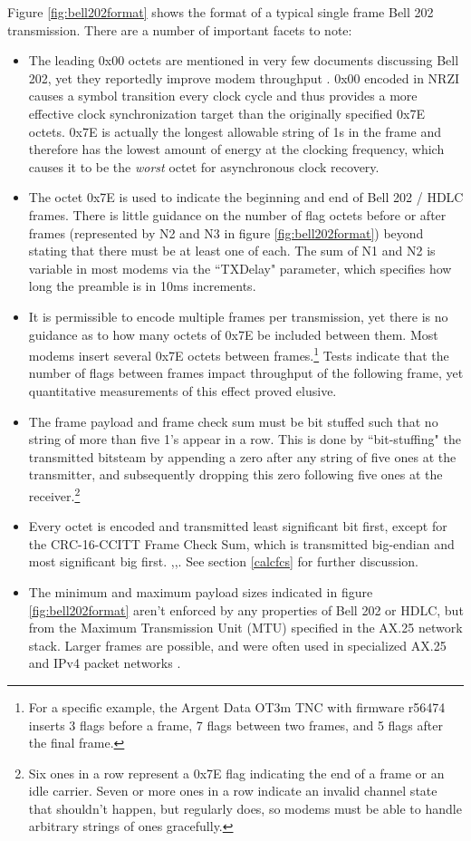 \documentclass[12pt,letterpaper]{article}
\begin{document}
Figure \ref{fig:bell202format} shows the format of a typical single frame
Bell 202 transmission. There are a number of important facets to note:
\begin{itemize}
	\item The leading 0x00 octets are mentioned in very few documents
		discussing Bell 202, yet they reportedly improve modem
		throughput \cite{millerinterview}\cite{aprsunveiled}. 
		0x00 encoded in NRZI causes a symbol transition
		every clock cycle and thus provides a more effective clock 
		synchronization target than the originally specified 0x7E octets. 
		0x7E is actually 
		the longest allowable string of 1s in the frame and 
		therefore has the lowest amount of energy at the clocking frequency,
		which causes it to be the \emph{worst} 
		octet for asynchronous clock recovery.
	\item The octet 0x7E is used to indicate the beginning and end of 
		Bell 202 / HDLC frames.
		There is little guidance on the number of flag octets before
		or after frames (represented by N2 and N3 in 
		figure \ref{fig:bell202format})
		beyond stating that there must be at least one of each. The sum of
		N1 and N2 is variable in most modems via the ``TXDelay" parameter,
		which specifies how long the preamble is in 10ms increments.
	\item It is permissible to encode multiple 
		frames per transmission, yet there is no guidance as to how
		many octets of 0x7E be included between them.
		Most modems insert several 0x7E octets between 
		frames.\footnote{For a specific example, the Argent Data OT3m TNC 
			with firmware r56474 inserts 3 flags before
		a frame, 7 flags between two frames, and 5 flags after the final frame.}
		Tests indicate that the number of flags between frames 
		impact throughput of the following frame, yet
		quantitative measurements of this effect proved elusive.
	\item The frame payload and frame check sum must be bit stuffed such 
		that no string of more than five 1's appear in a row.
		This is done by ``bit-stuffing" the transmitted bitsteam by
		appending a zero after any string of five ones at the transmitter,
		and subsequently dropping this zero following five ones at the 
		receiver.\footnote{Six ones in a row represent a 0x7E flag indicating 
			the end of a frame or an idle carrier.
			Seven or more ones in a row indicate an invalid channel state
			that shouldn't happen, but regularly does, so modems must be 
			able to handle arbitrary strings of ones gracefully.}
	\item Every octet is encoded and transmitted least significant bit first,
		except for the CRC-16-CCITT Frame Check Sum, 
		which is transmitted big-endian
		and most significant big first.
		\cite{n1vgphy},\cite[\S8.1.1-2]{ituv42},\cite[\S3.8]{ax25spec}.
		See section \ref{calcfcs} for further discussion.
	\item The minimum and maximum payload sizes indicated in figure 
		\ref{fig:bell202format} aren't enforced by any properties of 
		Bell 202 or HDLC, but from the Maximum Transmission Unit (MTU)
		specified in the AX.25 network stack.
		Larger frames are possible, and were often used in specialized 
		AX.25 and IPv4 packet networks \cite{pattersoninterview}.


\end{itemize}
\end{document}
